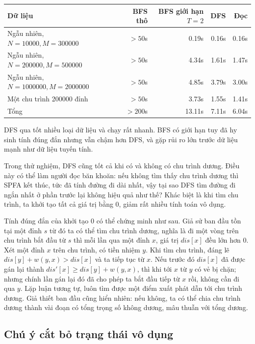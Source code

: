 \documentclass[11pt]{article}
\begin{document}
\begin{center}
\small
\begin{tabular}{|l|r|r|r|r|}
\hline
Dữ liệu & BFS thô & BFS giới hạn \(T=2\) & DFS & Đọc \\
\hline
Ngẫu nhiên, \(N=10000,M=300000\) & \(>50\)s & 0.19s & 0.16s & 0.16s \\
Ngẫu nhiên, \(N=200000,M=500000\) & \(>50\)s & 4.34s & 1.61s & 1.47s \\
Ngẫu nhiên, \(N=1000000,M=2000000\) & \(>50\)s & 4.85s & 3.79s & 3.00s \\
Một chu trình 200000 đỉnh & \(>50\)s & 3.73s & 1.55s & 1.41s \\
Tổng & \(>200\)s & 13.11s & 7.11s & 6.04s \\
\hline
\end{tabular}
\end{center}

DFS qua tốt nhiều loại dữ liệu và chạy rất nhanh. BFS có giới hạn tuy đã hy
sinh tính đúng đắn nhưng vẫn chậm hơn DFS, và gặp rủi ro lớn trước dữ liệu
mạnh như dữ liệu tuyến tính.

Trong thử nghiệm, DFS cũng tốt cả khi có và không có chu trình dương. Điều này
có thể làm người đọc băn khoăn: nếu không tìm thấy chu trình dương thì SPFA
kết thúc, tức đã tính đường đi dài nhất, vậy tại sao DFS tìm đường đi ngắn
nhất ở phần trước lại không hiệu quả như thế? Khác biệt là khi tìm chu trình,
ta khởi tạo tất cả giá trị bằng 0, giảm rất nhiều tính toán vô dụng.

Tính đúng đắn của khởi tạo 0 có thể chứng minh như sau. Giả sử ban đầu tồn tại
một đỉnh \(s\) từ đó ta có thể tìm chu trình dương, nghĩa là đi một vòng trên
chu trình bắt đầu từ \(s\) thì mỗi lần qua một đỉnh \(x\), giá trị
\(\mathit{dis}[x]\) đều lớn hơn 0. Xét một đỉnh \(x\) trên chu trình, có tiền
nhiệm \(y\). Khi tìm chu trình, đáng lẽ \(\mathit{dis}[y]+w(y,x)>\mathit{dis}[x]\)
và ta tiếp tục từ \(x\). Nếu trước đó \(\mathit{dis}[x]\) đã được gán lại
thành \(\mathit{dis}'[x]\ge \mathit{dis}[y]+w(y,x)\), thì khi tới \(x\) từ
\(y\) có vẻ bị chặn; nhưng chính lần gán lại đó đã cho phép ta bắt đầu tiếp
từ \(x\) rồi, không cần đi qua \(y\). Lặp luận tương tự, luôn tìm được một
điểm xuất phát dẫn tới chu trình dương. Giả thiết ban đầu cũng hiển nhiên:
nếu không, ta có thể chia chu trình dương thành vài đoạn có tổng trọng số
không dương, mâu thuẫn với tổng dương.

\subsection{Chú ý cắt bỏ trạng thái vô dụng}
\end{document}

